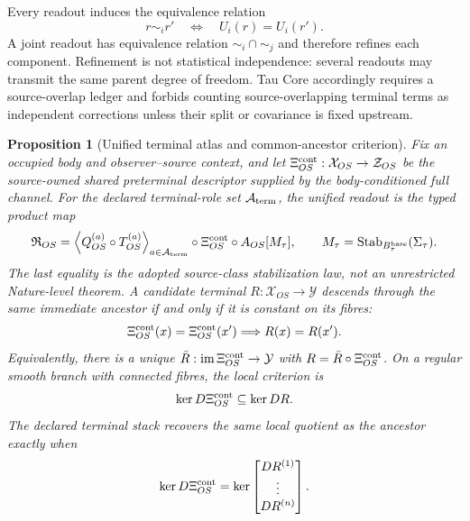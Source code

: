 \documentclass[11pt]{article}
\newtheorem{proposition}{Proposition}
\begin{document}
Every readout induces the equivalence relation
\begin{equation}
 r\sim_i r'\quad\Longleftrightarrow\quad U_i(r)=U_i(r').
 \label{eq:readout-equivalence}
\end{equation}
A joint readout has equivalence relation \(\sim_i\cap\sim_j\) and therefore
refines each component.  Refinement is not statistical independence: several
readouts may transmit the same parent degree of freedom.  Tau Core accordingly
requires a source-overlap ledger and forbids counting source-overlapping
terminal terms as independent corrections unless their split or covariance is
fixed upstream.


\begin{proposition}[Unified terminal atlas and common-ancestor criterion]
\label{prop:mopr-ancestor}
Fix an occupied body and observer--source context, and let
\(\Xi_{OS}^{\rm cont}:\mathcal X_{OS}\to\mathcal Z_{OS}\) be the source-owned shared
preterminal descriptor supplied by the body-conditioned full channel.  For the
declared terminal-role set \(\mathcal A_{\rm term}\), the unified readout is the
typed product map
\begin{equation}
 \mathfrak R_{OS}
 =
 \left\langle
   Q_{OS}^{(a)}\circ T_{OS}^{(a)}
 \right\rangle_{a\in\mathcal A_{\rm term}}
 \circ\Xi_{OS}^{\rm cont}\circ A_{OS}[M_\tau],
 \qquad
 M_\tau=\operatorname{Stab}_{B_\tau^{\rm base}}(\Sigma_\tau).
 \label{eq:unified-terminal-atlas}
\end{equation}
The last equality is the adopted source-class stabilization law, not an
unrestricted Nature-level theorem.  A candidate terminal
\(R:\mathcal X_{OS}\to\mathcal Y\) descends through the same immediate ancestor
if and only if it is constant on its fibres:
\begin{equation}
 \Xi_{OS}^{\rm cont}(x)=\Xi_{OS}^{\rm cont}(x')
 \Longrightarrow R(x)=R(x').
 \label{eq:mopr-fibre-criterion}
\end{equation}
Equivalently, there is a unique
\(\bar R:\operatorname{im}\Xi_{OS}^{\rm cont}\to\mathcal Y\) with
\(R=\bar R\circ\Xi_{OS}^{\rm cont}\).  On a regular smooth branch with connected fibres,
the local criterion is
\begin{equation}
 \ker D\Xi_{OS}^{\rm cont}\subseteq\ker DR.
 \label{eq:mopr-kernel-criterion}
\end{equation}
The declared terminal stack recovers the same local quotient as the ancestor
exactly when
\begin{equation}
 \ker D\Xi_{OS}^{\rm cont}
 =
 \ker
 \begin{bmatrix}
  DR^{(1)}\\ \vdots\\ DR^{(n)}
 \end{bmatrix}.
 \label{eq:mopr-stack-completeness}
\end{equation}
\end{proposition}
\end{document}
